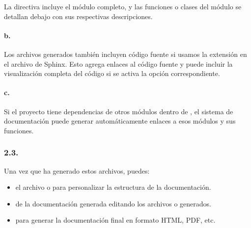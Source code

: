 \documentclass[a4paper,10pt,spanish]{sphinxmanual}
\begin{document}
\sphinxAtStartPar
La directiva  incluye el módulo completo, y las funciones o clases del módulo se detallan debajo con sus respectivas descripciones.


\paragraph{b. }
\label{\detokenize{configuracion_inicial/007.Creacion_de_ficheros_de_codigo_y_generacion_automatica_de_documentacion:b-incluir-todo-el-codigo-del-proyecto}}
\sphinxAtStartPar
Los archivos generados también incluyen código fuente si usamos la extensión  en el archivo  de Sphinx. Esto agrega enlaces al código fuente y puede incluir la visualización completa del código si se activa la opción correspondiente.


\paragraph{c. }
\label{\detokenize{configuracion_inicial/007.Creacion_de_ficheros_de_codigo_y_generacion_automatica_de_documentacion:c-dependencias-de-modulos}}
\sphinxAtStartPar
Si el proyecto tiene dependencias de otros módulos dentro de , el sistema de documentación puede generar automáticamente enlaces a esos módulos y sus funciones.


\subsubsection{2.3. }
\label{\detokenize{configuracion_inicial/007.Creacion_de_ficheros_de_codigo_y_generacion_automatica_de_documentacion:uso-de-los-archivos-generados}}
\sphinxAtStartPar
Una vez que  ha generado estos archivos, puedes:
\begin{itemize}
\item {} 
\sphinxAtStartPar
{} el archivo  o  para personalizar la estructura de la documentación.

\item {} 
\sphinxAtStartPar
{} de la documentación generada editando los archivos  o  generados.

\item {} 
\sphinxAtStartPar
{} para generar la documentación final en formato HTML, PDF, etc.

\end{itemize}
\end{document}
